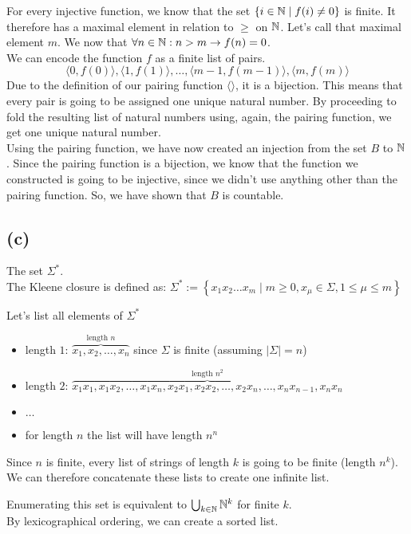 For every injective function, we know that the set $\left\{ i \in \mathbb{N} \mid f(i) \neq 0 \right\}$ is finite. It therefore has a maximal element in relation to $\geq$ on $\mathbb{N}$. Let's call that maximal element $m$. We now that $\forall n \in \mathbb{N}: n>m\rightarrow f(n)=0$.\\
We can encode the function $f$ as a finite list of pairs.
$$\langle 0, f(0) \rangle, \langle 1, f(1) \rangle, \ldots, \langle m-1, f(m-1)\rangle, \langle m, f(m) \rangle$$
Due to the definition of our pairing function $\langle\rangle$, it is a bijection. This means that every pair is going to be assigned one unique natural number. By proceeding to fold the resulting list of natural numbers using, again, the pairing function, we get one unique natural number.\\
Using the pairing function, we have now created an injection from the set $B$ to $\mathbb{N}$. Since the pairing function is a bijection, we know that the function we constructed is going to be injective, since we didn't use anything other than the pairing function. So, we have shown that $B$ is countable.

\subsection{(c)}
The set $\Sigma^{\ast}$.\\
The Kleene closure is defined as: $\Sigma^{\ast}:= \left\{ x_{1}x_{2}\ldots x_{m} \mid m \geq 0, x_\mu \in \Sigma, 1 \leq \mu \leq m \right\}$

Let's list all elements of $\Sigma^{\ast}$
\begin{itemize}
    \item length $1$: $\overbrace{x_{1},x_{2},\ldots,x_{n}}^{\text{length } n}$ since $\Sigma$ is finite (assuming $\lvert \Sigma \rvert = n$)
    \item length $2$: $\overbrace{x_{1}x_{1}, x_{1}x_{2}, \ldots, x_{1}x_{n}, x_{2}x_{1}, x_{2}x_{2}, \ldots, x_{2}x_{n}, \ldots, x_{n}x_{n-1}, x_{n}x_{n}}^{\text{length }n^2}$
    \item $\ldots$
    \item for length $n$ the list will have length $n^{n}$
\end{itemize}

Since $n$ is finite, every list of strings of length $k$ is going to be finite (length $n^k$).\\
We can therefore concatenate these lists to create one infinite list.

Enumerating this set is equivalent to $\bigcup_{k\in \mathbb{N}}\mathbb{N}^{k}$ for finite $k$.\\
By lexicographical ordering, we can create a sorted list.

